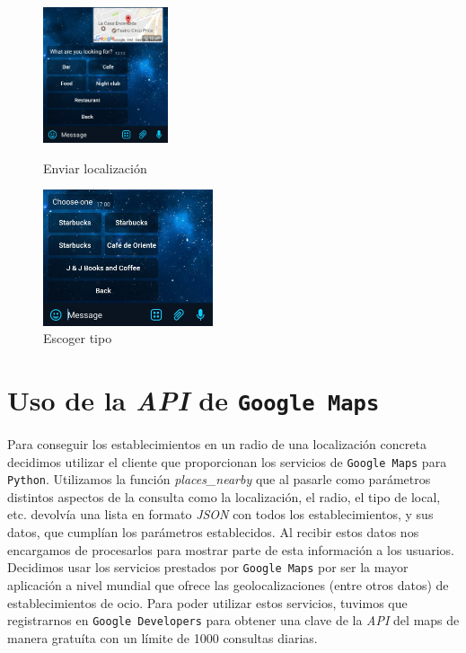 \documentclass[oneside]{memoir}
\begin{document}
\begin{figure}[h!]
\centering
\begin{minipage}{6cm}
  \centering
  \includegraphics[height=40mm]{paso1v1.jpg}
  \caption{Enviar localización}
  \label{fig:Paso1v1}
\end{minipage}%
\begin{minipage}{6cm}
  \centering
  \includegraphics[height=40mm]{paso2v1.jpg}
  \caption{Escoger tipo}
  \label{fig:Paso2v1}
\end{minipage}
\end{figure}

\section{Uso de la \textit{API} de \texttt{Google Maps}}
Para conseguir los establecimientos en un radio de una localización concreta decidimos utilizar el cliente que proporcionan los servicios de \texttt{Google Maps} para \texttt{Python}. Utilizamos la función \textit{places\_nearby} que al pasarle como parámetros distintos aspectos de la consulta como la localización, el radio, el tipo de local, etc. devolvía una lista en formato \textit{JSON} con todos los establecimientos, y sus datos, que cumplían los parámetros establecidos. Al recibir estos datos nos encargamos de procesarlos para mostrar parte de esta información a los usuarios. 
Decidimos usar los servicios prestados por \texttt{Google Maps} por ser la mayor aplicación a nivel mundial que ofrece las geolocalizaciones (entre otros datos) de establecimientos de ocio. Para poder utilizar estos servicios, tuvimos que registrarnos en \texttt{Google Developers} para obtener una clave de la \textit{API} del maps de manera gratuíta con un límite de 1000 consultas diarias.
\end{document}
